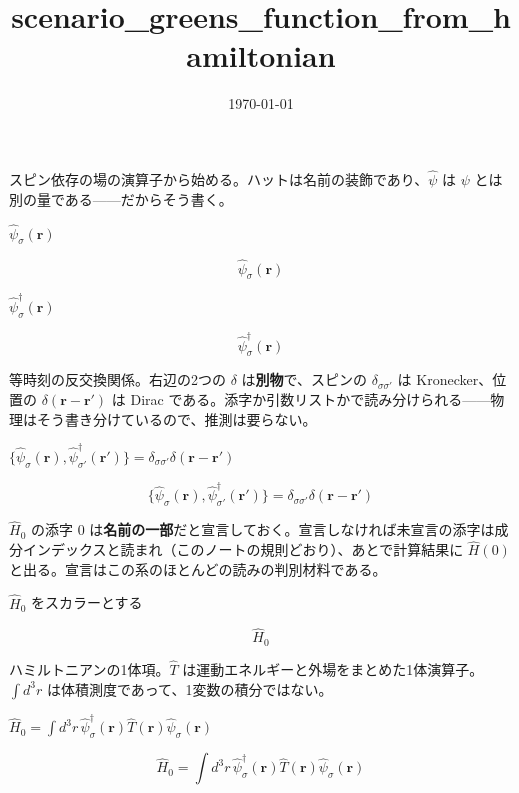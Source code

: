 \documentclass[dvipdfmx,a4paper,11pt]{jsarticle}
\title{scenario\_greens\_function\_from\_hamiltonian}
\date{\today}
\begin{document}
\maketitle

スピン依存の場の演算子から始める。ハットは名前の装飾であり、$\hat\psi$ は $\psi$ とは別の量である——だからそう書く。

$\hat\psi_\sigma(\mathbf{r})$

\begin{equation}
  \hat\psi_\sigma(\mathbf{r})
  \label{eq:E1}
\end{equation}

$\hat\psi^\dagger_\sigma(\mathbf{r})$

\begin{equation}
  \hat\psi^\dagger_\sigma(\mathbf{r})
  \label{eq:E2}
\end{equation}

等時刻の反交換関係。右辺の2つの $\delta$ は\textbf{別物}で、スピンの $\delta_{\sigma\sigma'}$ は Kronecker、位置の $\delta(\mathbf r-\mathbf r')$ は Dirac である。添字か引数リストかで読み分けられる——物理はそう書き分けているので、推測は要らない。

$\{\hat\psi_\sigma(\mathbf{r}), \hat\psi^\dagger_{\sigma'}(\mathbf{r}')\} = \delta_{\sigma\sigma'}\delta(\mathbf{r}-\mathbf{r}')$

\begin{equation}
  \{\hat\psi_\sigma(\mathbf{r}), \hat\psi^\dagger_{\sigma'}(\mathbf{r}')\} = \delta_{\sigma\sigma'}\delta(\mathbf{r}-\mathbf{r}')
  \label{eq:E3}
\end{equation}

$\hat H_0$ の添字 0 は\textbf{名前の一部}だと宣言しておく。宣言しなければ未宣言の添字は成分インデックスと読まれ（このノートの規則どおり）、あとで計算結果に $\hat H(0)$ と出る。宣言はこの系のほとんどの読みの判別材料である。

$\hat H_0$ をスカラーとする

\[
  \hat{H}_{0}
\]

ハミルトニアンの1体項。$\hat T$ は運動エネルギーと外場をまとめた1体演算子。$\int d^3r$ は体積測度であって、1変数の積分ではない。

$\hat H_0 = \int d^3r\, \hat\psi^\dagger_\sigma(\mathbf{r}) \hat T(\mathbf{r}) \hat\psi_\sigma(\mathbf{r})$

\begin{equation}
  \hat H_0 = \int d^3r\, \hat\psi^\dagger_\sigma(\mathbf{r}) \hat T(\mathbf{r}) \hat\psi_\sigma(\mathbf{r})
  \label{eq:E4}
\end{equation}
\end{document}
